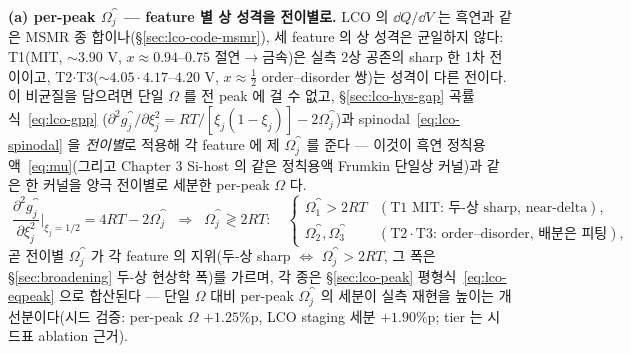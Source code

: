 \textbf{(a) per-peak $\Omega_j^\cat$ --- feature 별 상 성격을 전이별로.} LCO 의 $\dd Q/\dd V$ 는 흑연과 같은 MSMR 종
합이나(\S\ref{sec:lco-code-msmr}), 세 feature 의 상 성격은 균일하지 않다: T1(MIT, $\sim\!3.90$ V, $x\!\approx\!0.94$--$0.75$
절연$\to$금속)은 실측 2상 공존의 sharp 한 1차 전이이고\cite{reimers1992,menetrier1999,motohashi2009},
T2$\cdot$T3($\sim\!4.05\cdot4.17$--$4.20$ V, $x\!\approx\!\tfrac12$ order--disorder 쌍)는 성격이 다른 전이다. 이
비균질을 담으려면 단일 $\Omega$ 를 전 peak 에 걸 수 없고, \S\ref{sec:lco-hys-gap} 곡률식~\eqref{eq:lco-gpp}
($\partial^2 g_j^\cat/\partial\xi_j^2=RT/[\xi_j(1-\xi_j)]-2\Omega_j^\cat$)과 spinodal~\eqref{eq:lco-spinodal} 을
\emph{전이별}로 적용해 각 feature 에 제 $\Omega_j^\cat$ 를 준다 --- 이것이 흑연 정칙용액~\eqref{eq:mu}(그리고 Chapter 3
Si-host 의 같은 정칙용액 Frumkin 단일상 커널)과 같은 한 커널을 양극 전이별로 세분한 per-peak $\Omega$ 다.
\begin{equation}
\boxed{\;\frac{\partial^2 g_j^\cat}{\partial\xi_j^2}\bigg|_{\xi_j=1/2}=4RT-2\Omega_j^\cat
\;\;\Longrightarrow\;\;\Omega_j^\cat\gtrless2RT:\quad
\begin{cases}
\Omega_1^\cat>2RT & (\text{T1 MIT: 두-상 sharp, near-delta}),\\[2pt]
\Omega_{2}^\cat,\Omega_{3}^\cat & (\text{T2}\cdot\text{T3: order--disorder, 배분은 피팅}),
\end{cases}\;}
\label{eq:lco-omega-perpeak}
\end{equation}
곧 전이별 $\Omega_j^\cat$ 가 각 feature 의 지위(두-상 sharp $\Leftrightarrow$ $\Omega_j^\cat\!>\!2RT$, 그 폭은
\S\ref{sec:broadening} 두-상 현상학 폭)를 가르며, 각 종은 \S\ref{sec:lco-peak} 평형식~\eqref{eq:lco-eqpeak} 으로
합산된다 --- 단일 $\Omega$ 대비 per-peak $\Omega_j^\cat$ 의 세분이 실측 재현을 높이는 개선분이다(시드 검증:
per-peak $\Omega$ $+1.25$\%p, LCO staging 세분 $+1.90$\%p; tier 는 시드표 ablation 근거).

